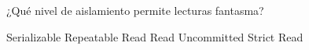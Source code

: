 \question[1] ¿Qué nivel de aislamiento permite lecturas fantasma?
\begin{choices}
\choice Serializable
\CorrectChoice Repeatable Read
\choice Read Uncommitted
\choice Strict Read
\end{choices}
